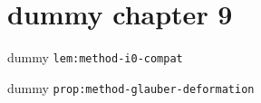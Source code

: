 \clearpage\begingroup\small
\setcounter{chapter}{9}\addtocounter{chapter}{-1}
\chapter{dummy chapter 9}
\begin{lemma}\label{lem:method-i0-compat}dummy \texttt{lem:method-i0-compat}\end{lemma}
\begin{proposition}\label{prop:method-glauber-deformation}dummy \texttt{prop:method-glauber-deformation}\end{proposition}
\endgroup
